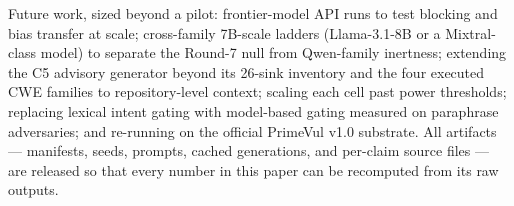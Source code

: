 Future work, sized beyond a pilot: frontier-model API runs to test
blocking and bias transfer at scale; cross-family 7B-scale ladders
(Llama-3.1-8B or a Mixtral-class model) to separate the Round-7 null from
Qwen-family inertness; extending the C5 advisory generator beyond its
26-sink inventory and the four executed CWE families to repository-level
context; scaling each cell past power thresholds; replacing lexical intent
gating with model-based gating measured on paraphrase adversaries; and
re-running on the official PrimeVul v1.0 substrate. All artifacts ---
manifests, seeds, prompts, cached generations, and per-claim source files ---
are released so that every number in this paper can be recomputed from its
raw outputs.
